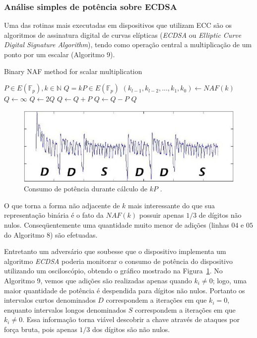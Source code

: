 \subsubsection{An\'{a}lise simples de pot\^{e}ncia sobre ECDSA}
Uma das rotinas mais executadas em dispositivos que utilizam ECC s\~{a}o os algoritmos de assinatura digital de curvas el\'{i}pticas (\textit{ECDSA} ou \textit{Elliptic Curve Digital Signature Algorithm}), tendo como opera\c{c}\~{a}o central a multiplica\c{c}\~{a}o de um ponto por um escalar (Algoritmo 9).

\begin{algorithm}[H]
\caption{Binary NAF method for scalar multiplication}
\begin{algorithmic}
    \REQUIRE $P \in E(\mathbb{F}_p), k \in \mathbb{N}$
    \ENSURE $Q = kP \in E(\mathbb{F}_p)$
    \STATE $(k_{l-1}, k_{l-2}, ..., k_{1}, k_{0}) \leftarrow NAF(k)$
    \STATE $Q \leftarrow \infty$
        \STATE $Q \leftarrow 2Q$
            \STATE $Q \leftarrow Q + P$
        \ENDIF
            \STATE $Q \leftarrow Q - P$
        \ENDIF
    \ENDFOR
    \RETURN $Q$
    \end{algorithmic}
\end{algorithm}

\begin{figure}[ht]
	\centering
	\includegraphics[width=.8\textwidth]{figures/spa1.jpg}
	\caption{Consumo de pot\^{e}ncia durante c\'{a}lculo de $kP$ \cite{ECCBook_HankersonVanstone2004}.}
	\label{fig:Fig5}
\end{figure}

O que torna a forma n\~{a}o adjacente de $k$ mais interessante do que sua representa\c{c}\~{a}o bin\'{a}ria \'{e} o fato da $NAF(k)$ possuir apenas $1/3$ de d\'{i}gitos n\~{a}o nulos. Conseq\"{u}entemente uma quantidade muito menor de adi\c{c}\~{o}es (linhas $04$ e $05$ do Algoritmo 8) s\~{a}o efetuadas.

Entretanto um advers\'{a}rio que soubesse que o dispositivo implementa um algoritmo \textit{ECDSA} poderia monitorar o consumo de pot\^{e}ncia do dispositivo utilizando um oscilosc\'{o}pio, obtendo o gr\'{a}fico mostrado na Figura~\ref{fig:Fig5}. No Algoritmo 9, vemos que adi\c{c}\~{o}es s\~{a}o realizadas apenas quando $k_{i} \neq 0$; logo, uma maior quantidade de pot\^{e}ncia \'{e} despendida para d\'{i}gitos n\~{a}o nulos. Portanto os intervalos curtos denominados $D$ correspondem a itera\c{c}\~{o}es em que $k_{i} = 0$, enquanto intervalos longos denominados $S$ correspondem a itera\c{c}\~{o}es em que $k_{i} \neq 0$. Essa informa\c{c}\~{a}o torna vi\'{a}vel descobrir a chave atrav\'{e}s de ataques por for\c{c}a bruta, pois apenas $1/3$ dos d\'{i}gitos s\~{a}o n\~{a}o nulos.

